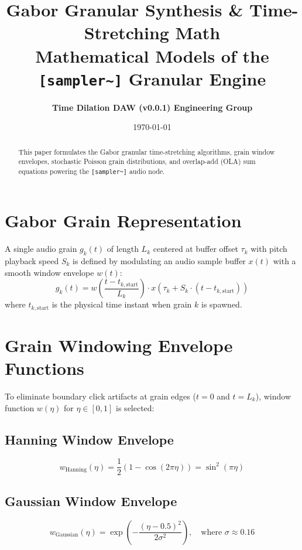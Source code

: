 \documentclass[11pt,a4paper]{article}
\title{\textbf{\Huge Gabor Granular Synthesis \& Time-Stretching Math}\\[0.5em]
\Large Mathematical Models of the \texttt{[sampler\textasciitilde{}]} Granular Engine}
\author{\textbf{Time Dilation DAW (v0.0.1) Engineering Group}}
\date{\today}
\begin{document}
\maketitle

\begin{abstract}
This paper formulates the Gabor granular time-stretching algorithms, grain window envelopes, stochastic Poisson grain distributions, and overlap-add (OLA) sum equations powering the \texttt{[sampler\textasciitilde{}]} audio node.
\end{abstract}

\section{Gabor Grain Representation}
A single audio grain $g_k(t)$ of length $L_k$ centered at buffer offset $\tau_k$ with pitch playback speed $S_k$ is defined by modulating an audio sample buffer $x(t)$ with a smooth window envelope $w(t)$:
\begin{equation}
g_k(t) = w\left(\frac{t - t_{k, \text{start}}}{L_k}\right) \cdot x\left(\tau_k + S_k \cdot (t - t_{k, \text{start}})\right)
\end{equation}
where $t_{k, \text{start}}$ is the physical time instant when grain $k$ is spawned.

\section{Grain Windowing Envelope Functions}
To eliminate boundary click artifacts at grain edges ($t = 0$ and $t = L_k$), window function $w(\eta)$ for $\eta \in [0, 1]$ is selected:

\subsection{Hanning Window Envelope}
\begin{equation}
w_{\text{Hanning}}(\eta) = \frac{1}{2} \left( 1 - \cos\left(2\pi \eta\right) \right) = \sin^2(\pi \eta)
\end{equation}

\subsection{Gaussian Window Envelope}
\begin{equation}
w_{\text{Gaussian}}(\eta) = \exp\left( -\frac{(\eta - 0.5)^2}{2\sigma^2} \right), \quad \text{where } \sigma \approx 0.16
\end{equation}
\end{document}
